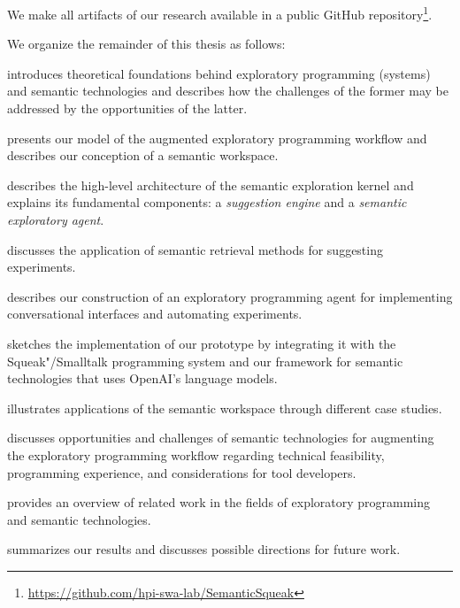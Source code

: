 We make all artifacts of our research available in a public GitHub repository\footnote{\url{https://github.com/hpi-swa-lab/SemanticSqueak}}. %

We organize the remainder of this thesis as follows:
%
\begin{description}[noextralabelsep]
	\item[\cref{cha:background}] introduces theoretical foundations behind exploratory programming (systems) and semantic technologies and describes how the challenges of the former may be addressed by the opportunities of the latter.
	\item[\cref{cha:approach}] presents our model of the augmented exploratory programming workflow and describes our conception of a semantic workspace.
	\item[\cref{cha:design}] describes the high-level architecture of the semantic exploration kernel and explains its fundamental components: a \emph{suggestion engine} and a \emph{semantic exploratory agent}.
	\item[\cref{cha:suggestions}] discusses the application of semantic retrieval methods for suggesting experiments.
	\item[\cref{cha:agent}] describes our construction of an exploratory programming agent for implementing conversational interfaces and automating experiments.
	\item[\cref{cha:implementation}] sketches the implementation of our prototype by integrating it with the Squeak"/Smalltalk programming system and our \semtex framework for semantic technologies that uses OpenAI's language models.
	\item[\cref{cha:application}] illustrates applications of the semantic workspace through different case studies.
	\item[\cref{cha:discussion}] discusses opportunities and challenges of semantic technologies for augmenting the exploratory programming workflow regarding technical feasibility, programming experience, and considerations for tool developers.
	\item[\cref{cha:related_work}] provides an overview of related work in the fields of exploratory programming and semantic technologies.
	\item[\cref{cha:conclusion}] summarizes our results and discusses possible directions for future work.
\end{description}
